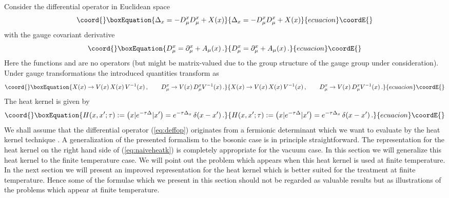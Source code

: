 \documentclass[a4paper,showpacs,showkeys,prd,nofootinbib]{revtex4}
\begin{document}
Consider the differential operator in Euclidean space
\begin{equation}\coord{}\boxEquation{
  \label{eq:deffop}
\Delta_x = -D^x_\mu D^x_\mu +X(x)
}{
  \Delta_x = -D^x_\mu D^x_\mu +X(x)
}{ecuacion}\coordE{}\end{equation}
with the gauge covariant derivative
\begin{equation}\coord{}\boxEquation{
  \label{eq:gaugeder}
D^x_\mu = \partial^x_\mu + A_\mu(x)  \,.
}{
  D^x_\mu = \partial^x_\mu + A_\mu(x)  \,.
}{ecuacion}\coordE{}\end{equation}
Here the functions \coordHE{} and \coordHE{} are no operators (but might be matrix-valued due to 
the group structure of the gauge group under consideration). 
Under gauge transformations the introduced quantities transform as
\begin{equation}\coord{}\boxEquation{
  \label{eq:gaugetrafo}
X(x) \to V(x)\, X(x) \, V^{-1}(x) \,, \qquad D^x_\mu \to V(x)\, D^x_\mu V^{-1}(x) \,.
}{
  X(x) \to V(x)\, X(x) \, V^{-1}(x) \,, \qquad D^x_\mu \to V(x)\, D^x_\mu V^{-1}(x) \,.
}{ecuacion}\coordE{}\end{equation}
The heat kernel is given by
\begin{equation}\coord{}\boxEquation{
  \label{eq:naiveheatk}
H(x,x';\tau) := \left( x \vert e^{-\tau \Delta} \vert x' \right) 
= e^{-\tau \Delta_x} \, \delta(x-x')  \,.
}{
  H(x,x';\tau) := \left( x \vert e^{-\tau \Delta} \vert x' \right) 
= e^{-\tau \Delta_x} \, \delta(x-x')  \,.
}{ecuacion}\coordE{}\end{equation}
We shall assume that the differential operator (\ref{eq:deffop}) originates from
a fermionic determinant which we want to evaluate by the heat kernel technique 
\cite{Ball:1989xg}. A generalization of the presented formalism to the bosonic case
is in principle straightforward.
The representation for the heat kernel on the right hand side of (\ref{eq:naiveheatk})
is completely appropriate for the vacuum case.
In this section we will generalize this heat kernel to the finite temperature case.
We will point out the problem which appears when this heat kernel is used at finite
temperature. In the next section we will present an improved representation for
the heat kernel which is better suited for the treatment at finite temperature.
Hence some of the formulae which we present in this section should not be regarded as
valuable results but as illustrations of the problems which appear at finite temperature.
\end{document}
